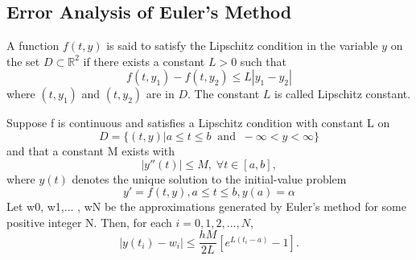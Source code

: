 \subsection*{Error Analysis of Euler's Method}
\begin{definition} 
	A function $f(t,y)$ is said to satisfy the Lipschitz condition in the variable $y$ on the set $D\subset \mathbb{R}^2$ if there exists a constant $L>0$ such that
	\[ f(t,y_1) - f(t,y_2) \leq L|y_1 - y_2| \]
	where $(t,y_1)$ and $(t,y_2)$ are in $D$. The constant $L$ is called Lipschitz constant.
\end{definition}

\begin{thm}
	Suppose f is continuous and satisfies a Lipschitz condition with constant L on
	\[ D = \{ (t,y)| a\leq t\leq b\;\;\text{and}\;\;-\infty< y < \infty \} \]
	and that a constant M exists with
	\[ |y''(t)|\leq M,\;\forall t \in [a, b], \]
	where $y(t)$ denotes the unique solution to the initial-value problem
	\[ y' = f(t, y), a \leq t \leq b, y(a) = \alpha \]
	Let w0, w1,... , wN be the approximations generated by Euler’s method for some positive integer N. Then, for each $i = 0, 1, 2,... , N$,
	\[ |y(t_i) - w_i| \leq \frac{hM}{2L}[ e^{L(t_i-a)} - 1 ].  \]
\end{thm}

